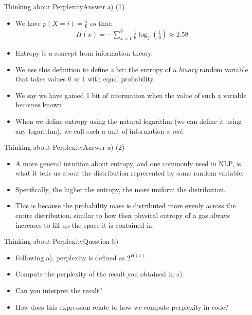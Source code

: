 \documentclass[t]{beamer}
\begin{document}
\begin{frame}{Thinking about Perplexity}{Answer a) (1)}
    \begin{itemize}
        \item We have $p(X = i) = \frac{1}{6}$ so that:
              \begin{align*}
                  H(x) = -\sum_{x=1}^6 \frac{1}{6}\log_2\left(\frac{1}{6}\right) \approx 2.58
              \end{align*}
        \item Entropy is a concept from information theory.
        \item We use this definition to define a bit: the entropy of a
              \emph{binary} random variable that takes values 0 or 1 with equal
              probability.
        \item We say we have gained 1 bit of information when the value of such
              a variable becomes known.
        \item When we define entropy using the natural logarithm (we can define it
              using any logarithm), we call such a unit of information a \emph{nat}.
    \end{itemize}
\end{frame}

\begin{frame}{Thinking about Perplexity}{Answer a) (2)}
    \begin{itemize}
        \item A more general intuition about entropy, and one commonly used in
              NLP, is what it tells us about the distribution represented by
              some random variable.
        \item Specifically, the higher the entropy, the more uniform the
              distribution.
        \item This is because the probability mass is distributed more evenly
              across the entire distribution, similar to how then physical
              entropy of a gas always increases to fill up the space it is
              contained in.
    \end{itemize}
\end{frame}

\begin{frame}{Thinking about Perplexity}{Question b)}
    \begin{itemize}
        \item Following a), perplexity is defined as $2^{H(x)}$.
        \item Compute the perplexity of the result you obtained in a).
        \item Can you interpret the result?
        \item How does this expression relate to how we compute perplexity in
              code?
    \end{itemize}
\end{frame}
\end{document}
